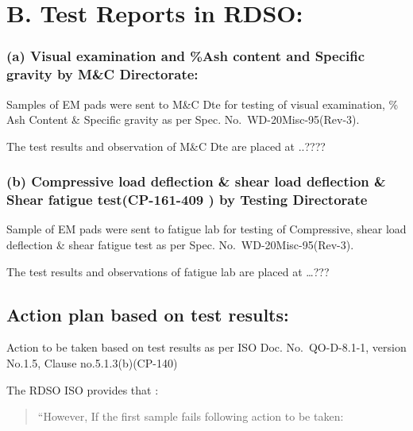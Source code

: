 \documentclass[nofonts,]{tufte-book}
\begin{document}
\hypertarget{b.-test-reports-in-rdso}{%
\chapter{B. Test Reports in RDSO:}\label{b.-test-reports-in-rdso}}

\hypertarget{a-visual-examination-and-ash-content-and-specific-gravity-by-mc-directorate}{%
\subsection{(a) Visual examination and \%Ash content and Specific
gravity by M\&C
Directorate:}\label{a-visual-examination-and-ash-content-and-specific-gravity-by-mc-directorate}}

Samples of EM pads were sent to M\&C Dte for testing of visual
examination, \% Ash Content \& Specific gravity as per Spec.
No.~WD-20Misc-95(Rev-3).

The test results and observation of M\&C Dte are placed at ..????

\hypertarget{b-compressive-load-deflection-shear-load-deflection-shear-fatigue-testcp-161-409-by-testing-directorate}{%
\subsection{(b) Compressive load deflection \& shear load deflection \&
Shear fatigue test(CP-161-409 ) by Testing
Directorate}\label{b-compressive-load-deflection-shear-load-deflection-shear-fatigue-testcp-161-409-by-testing-directorate}}

Sample of EM pads were sent to fatigue lab for testing of Compressive,
shear load deflection \& shear fatigue test as per Spec.
No.~WD-20Misc-95(Rev-3).

The test results and observations of fatigue lab are placed at \ldots???

\hypertarget{action-plan-based-on-test-results}{%
\section{Action plan based on test
results:}\label{action-plan-based-on-test-results}}

Action to be taken based on test results as per ISO Doc. No.~QO-D-8.1-1,
version No.1.5, Clause no.5.1.3(b)(CP-140)

The RDSO ISO provides that :

\begin{quote}
``However, If the first sample fails following action to be taken:
\end{quote}
\end{document}
